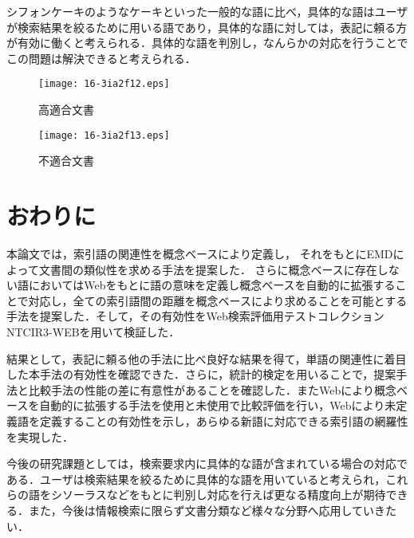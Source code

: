 \documentclass[japanese]{jnlp_1.4}
\begin{document}
シフォンケーキのようなケーキといった一般的な語に比べ，具体的な語はユーザが検索結果を絞るために用いる語であり，具体的な語に対しては，表記に頼る方が有効に働くと考えられる．具体的な語を判別し，なんらかの対応を行うことでこの問題は解決できると考えられる．

\begin{figure}[t]
\begin{center}
\texttt{[image: 16-3ia2f12.eps]}
\caption{高適合文書}
\label{figure:high_conformity_document}
\end{center}
\vspace{-0.5\baselineskip}
\end{figure}
\begin{figure}[t]
\begin{center}
\texttt{[image: 16-3ia2f13.eps]}
\caption{不適合文書}
\label{figure:non_conformity_document}
\end{center}
\vspace{-1\baselineskip}
\end{figure}


\section{おわりに}

本論文では，索引語の関連性を概念ベースにより定義し，
それをもとにEMDによって文書間の類似性を求める手法を提案した．
\pagebreak
さらに概念ベースに存在しない語においてはWebをもとに語の意味を定義し概念ベースを自動的に拡張することで対応し，全ての索引語間の距離を概念ベースにより求めることを可能とする手法を提案した．そして，その有効性をWeb検索評価用テストコレクションNTCIR3-WEBを用いて検証した．

結果として，表記に頼る他の手法に比べ良好な結果を得て，単語の関連性に着目した本手法の有効性を確認できた．さらに，統計的検定を用いることで，提案手法と比較手法の性能の差に有意性があることを確認した．またWebにより概念ベースを自動的に拡張する手法を使用と未使用で比較評価を行い，Webにより未定義語を定義することの有効性を示し，あらゆる新語に対応できる索引語の網羅性を実現した．

今後の研究課題としては，検索要求内に具体的な語が含まれている場合の対応である．ユーザは検索結果を絞るために具体的な語を用いていると考えられ，これらの語をシソーラスなどをもとに判別し対応を行えば更なる精度向上が期待できる．また，今後は情報検索に限らず文書分類など様々な分野へ応用していきたい．
\end{document}
